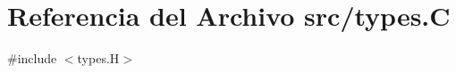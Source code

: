 \hypertarget{types_8_c}{}\section{Referencia del Archivo src/types.C}
\label{types_8_c}
{\ttfamily \#include $<$types.\+H$>$}\newline
